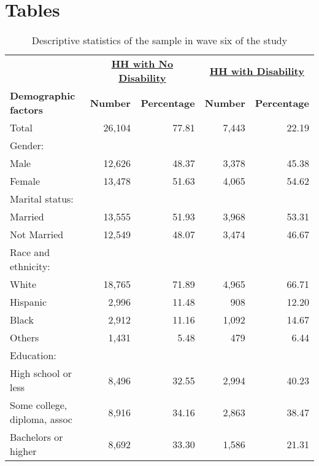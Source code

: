 
\section{Tables}

\noindent
\begin{table}[H] 
\centering 
\footnotesize
\caption{Descriptive statistics of the sample in wave six of the study} 
\begin{tabular}{lrrrr}
\hline 
\hline 
& \multicolumn{2}{c}{\underline{\bf{HH with No Disability}}} & \multicolumn{2}{c}{\underline{\bf{HH with Disability}}} \\
{\bf{Demographic factors}} & {\bf{Number}} & {\bf{Percentage}} & {\bf{Number}} & {\bf{Percentage}} \\
\hline 
Total					& 26,104	& 77.81		& 7,443		& 22.19		\\
Gender:					&		&		&		& 		\\
\hspace{5pt} Male			& 12,626	& 48.37		& 3,378		& 45.38		\\
\hspace{5pt} Female			& 13,478	& 51.63		& 4,065		& 54.62		\\
Marital status:				&		&		&		& 		\\
\hspace{5pt} Married			& 13,555	& 51.93		& 3,968		& 53.31		\\
\hspace{5pt} Not Married		& 12,549	& 48.07		& 3,474		& 46.67		\\
Race and ethnicity:			&		&		&		& 		\\
\hspace{5pt} White			& 18,765 	& 71.89		& 4,965		& 66.71		\\
\hspace{5pt} Hispanic			&  2,996	& 11.48		&   908		& 12.20		\\
\hspace{5pt} Black			&  2,912	& 11.16		& 1,092		& 14.67		\\
\hspace{5pt} Others			&  1,431	&  5.48		&   479		&  6.44		\\
Education:				&		&		&		& 		\\
\hspace{5pt} High school or less	&  8,496 	& 32.55		& 2,994		& 40.23		\\
\hspace{5pt} Some college, diploma, assoc& 8,916 	& 34.16		& 2,863		& 38.47		\\
\hspace{5pt} Bachelors or higher	&  8,692 	& 33.30		& 1,586		& 21.31		\\
\hline 
\hline 
\end{tabular}
\label{tab:DescStats}
\end{table}


